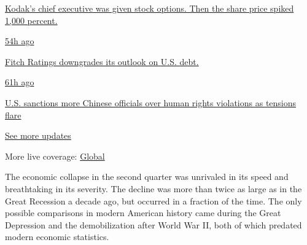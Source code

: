 \href{https://www.nytimes3xbfgragh.onion/live/2020/07/31/business/stock-market-today-coronavirus?action=click\&pgtype=Article\&state=default\&region=MAIN_CONTENT_1\&context=storylines_live_updates\#kodaks-chief-executive-was-given-stock-options-then-the-share-price-spiked-1000-percent}{Kodak's
chief executive was given stock options. Then the share price spiked
1,000 percent.}

\href{https://www.nytimes3xbfgragh.onion/live/2020/07/31/business/stock-market-today-coronavirus?action=click\&pgtype=Article\&state=default\&region=MAIN_CONTENT_1\&context=storylines_live_updates\#fitch-ratings-downgrades-its-outlook-on-us-debt}{54h
ago}

\href{https://www.nytimes3xbfgragh.onion/live/2020/07/31/business/stock-market-today-coronavirus?action=click\&pgtype=Article\&state=default\&region=MAIN_CONTENT_1\&context=storylines_live_updates\#fitch-ratings-downgrades-its-outlook-on-us-debt}{Fitch
Ratings downgrades its outlook on U.S. debt.}

\href{https://www.nytimes3xbfgragh.onion/live/2020/07/31/business/stock-market-today-coronavirus?action=click\&pgtype=Article\&state=default\&region=MAIN_CONTENT_1\&context=storylines_live_updates\#us-sanctions-more-chinese-officials-over-human-rights-violations-as-tensions-flare}{61h
ago}

\href{https://www.nytimes3xbfgragh.onion/live/2020/07/31/business/stock-market-today-coronavirus?action=click\&pgtype=Article\&state=default\&region=MAIN_CONTENT_1\&context=storylines_live_updates\#us-sanctions-more-chinese-officials-over-human-rights-violations-as-tensions-flare}{U.S.
sanctions more Chinese officials over human rights violations as
tensions flare}

\href{https://www.nytimes3xbfgragh.onion/live/2020/07/31/business/stock-market-today-coronavirus?action=click\&pgtype=Article\&state=default\&region=MAIN_CONTENT_1\&context=storylines_live_updates}{See
more updates}

More live coverage:
\href{https://www.nytimes3xbfgragh.onion/2020/08/01/world/coronavirus-covid-19.html?action=click\&pgtype=Article\&state=default\&region=MAIN_CONTENT_1\&context=storylines_live_updates}{Global}

The economic collapse in the second quarter was unrivaled in its speed
and breathtaking in its severity. The decline was more than twice as
large as in the Great Recession a decade ago, but occurred in a fraction
of the time. The only possible comparisons in modern American history
came during the Great Depression and the demobilization after World War
II, both of which predated modern economic statistics.

